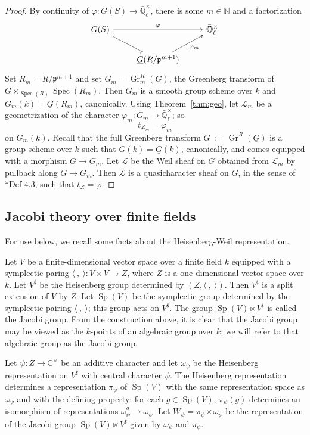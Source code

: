 \documentclass[10pt]{amsart}
\theoremstyle{plain}
\theoremstyle{definition}
\newcommand{\NN}{{\mathbb{N}}}
\newcommand{\CC}{{\mathbb{C}}}
\newcommand{\EE}{\mathbb{\bar Q}_\ell}
\newcommand{\Fq}{k}
\newcommand{\EEx}{\EE^\times}
\DeclareMathOperator{\Gr}{Gr}
\newcommand{\Spec}[1]{{\operatorname{Spec}(#1)}}
\newcommand{\ceq}{{\, :=\, }}
\newcommand{\trFrob}[1]{t_{#1}}
\newcommand{\cs}[1]{{\mathcal{#1}}}
\newcommand{\Sp}{{\operatorname{Sp}}}
\begin{document}
\begin{proof}
By continuity of $\varphi : \underline{G}(S) \to \EE^\times$, there is some $m \in \NN$ and a factorization
\[
\begin{tikzcd}
\underline{G}(S) \arrow{rr}{\varphi} \arrow{rd} && \EEx\\
& \underline{G}(R/\mathfrak{p}^{m+1}) \arrow{ru}[swap]{\varphi_m} 
\end{tikzcd}
\] 
Set $R_m = R/\mathfrak{p}^{m+1}$ and
set $G_m = \Gr_m^{R}(\underline{G})$, the Greenberg transform of $\underline{G}\times_{\Spec{R}}\Spec{R_m}$.
Then $G_m$ is a smooth group scheme over $\Fq$ and $G_m(\Fq) = \underline{G}(R_m)$, canonically.
Using Theorem~\ref{thm:geo}, let $\cs{L}_m$ be a geometrization of the character $\varphi_m: G_m \to \EEx$; so
\[
\trFrob{\cs{L}_m} = \varphi_m
\]
on $G_m(\Fq)$.
%
Recall that the full Greenberg transform $G \ceq \Gr^{R}(\underline{G})$ is a group scheme over $\Fq$ such that $G(\Fq) = \underline{G}(\Fq)$, canonically, and comes equipped with a morphism $G \to G_m$.
Let $\cs{L}$ be the  Weil sheaf on $G$ obtained from $\cs{L}_m$ by pullback along $G \to G_m$. 
Then $\cs{L}$ is a quasicharacter sheaf on $G$, in the sense of \cite{cunningham-roe:13a}*{Def 4.3}, such that $\trFrob{\cs{L}} = \varphi$.
\end{proof}

\subsection{Jacobi theory over finite fields}\label{ssec:Jacobi}

For use below, we recall some facts about the Heisenberg-Weil representation.

Let $V$ be a finite-dimensional vector space over a finite field $\Fq$ equipped with a symplectic paring $\langle\ ,\ \rangle : V\times V \to Z$, where $Z$ is a one-dimensional vector space over $\Fq$.
Let $V^\sharp$ be the Heisenberg group determined by $(Z, \langle\ ,\ \rangle)$.
Then $V^\sharp$ is a split extension of $V$ by $Z$.
Let $\Sp(V)$ be the symplectic group determined by the symplectic pairing $\langle\ ,\ \rangle$; this group acts on $V^\sharp$.
The group $\Sp(V)\ltimes V^\sharp$ is called the Jacobi group. 
From the construction above, it is clear that the Jacobi group may be viewed as the $\Fq$-points of an algebraic group over $\Fq$; we will refer to that algebraic group as the Jacobi group.

Let $\psi : Z \to \CC^\times$ be an additive character and let $\omega_\psi$ be the Heisenberg representation on $V^\sharp$ with central character $\psi$. 
The Heisenberg representation determines a representation $\pi_{\psi}$ of $\Sp(V)$ with the same representation space as $\omega_\psi$ and with the defining property: for each $g\in \Sp(V)$, $\pi_\psi(g)$ determines an isomorphism of representations $\omega_\psi^g \to \omega_\psi$.
Let $W_\psi = \pi_\psi \ltimes \omega_\psi$ be the representation of the Jacobi group $\Sp(V)\ltimes V^\sharp$ given by $\omega_\psi$ and $\pi_\psi$.
\end{document}
